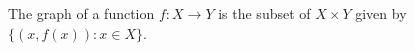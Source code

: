 \documentclass[12pt]{article}
\begin{document}
The graph of a function $f:X\rightarrow Y$ is the subset of $X\times Y$ given by  $\{(x,f(x)) : x\in X\}$.
\end{document}
